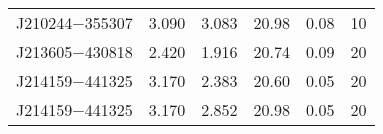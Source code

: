 \begin{table}
\begin{center}
{\begin{tabular}{lccccr}
 J210244$-$355307 &      3.090 &                    3.083 &                   20.98 &               0.08 &                10 \\
 J213605$-$430818 &      2.420 &                    1.916 &                   20.74 &               0.09 &                20 \\
 J214159$-$441325 &      3.170 &                    2.383 &                   20.60 &               0.05 &                20 \\
 J214159$-$441325 &      3.170 &                    2.852 &                   20.98 &               0.05 &                20 \\
\end{tabular}
}
\end{center}
\end{table}


